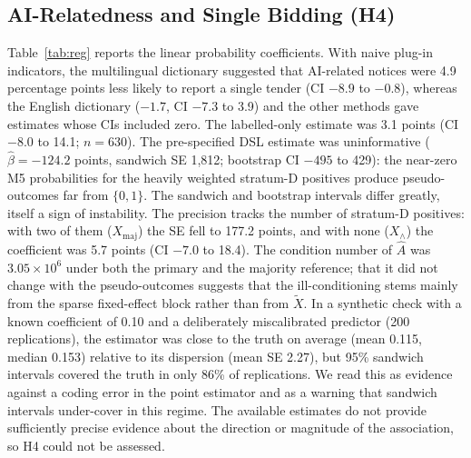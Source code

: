 \documentclass[runningheads]{llncs}
\begin{document}
\subsection{AI-Relatedness and Single Bidding (H4)}
\label{sec:reg}
Table~\ref{tab:reg} reports the linear probability coefficients. With naive plug-in indicators, the multilingual dictionary suggested that AI-related notices were 4.9 percentage points less likely to report a single tender (CI $-8.9$ to $-0.8$), whereas the English dictionary ($-1.7$, CI $-7.3$ to 3.9) and the other methods gave estimates whose CIs included zero. The labelled-only estimate was 3.1 points (CI $-8.0$ to 14.1; $n=630$). The pre-specified DSL estimate was uninformative ($\hat\beta=-124.2$ points, sandwich SE 1,812; bootstrap CI $-495$ to 429): the near-zero M5 probabilities for the heavily weighted stratum-D positives produce pseudo-outcomes far from $\{0,1\}$. The sandwich and bootstrap intervals differ greatly, itself a sign of instability. The precision tracks the number of stratum-D positives: with two of them ($X_{\mathrm{maj}}$) the SE fell to 177.2 points, and with none ($X_\wedge$) the coefficient was 5.7 points (CI $-7.0$ to 18.4). The condition number of $\hat{A}$ was $3.05\times10^{6}$ under both the primary and the majority reference; that it did not change with the pseudo-outcomes suggests that the ill-conditioning stems mainly from the sparse fixed-effect block rather than from $\tilde{X}$. In a synthetic check with a known coefficient of 0.10 and a deliberately miscalibrated predictor (200 replications), the estimator was close to the truth on average (mean 0.115, median 0.153) relative to its dispersion (mean SE 2.27), but 95\% sandwich intervals covered the truth in only 86\% of replications. We read this as evidence against a coding error in the point estimator and as a warning that sandwich intervals under-cover in this regime. The available estimates do not provide sufficiently precise evidence about the direction or magnitude of the association, so H4 could not be assessed.
\end{document}
